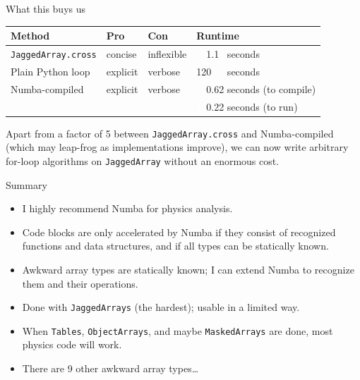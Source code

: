 \documentclass[aspectratio=169]{beamer}
\begin{document}
\begin{frame}{What this buys us}
\large
\vspace{0.5 cm}
\begin{center}
\begin{tabular}{l l l l}
{\bf Method} & {\bf Pro}  & {\bf Con}  & {\bf Runtime} \\\hline
{\tt\normalsize JaggedArray.cross} & concise  & inflexible & \textcolor{white}{12}1.1\textcolor{white}{2} seconds \\
Plain Python loop       & explicit & verbose    & 120\textcolor{white}{.62} seconds \\
Numba-compiled          & explicit & verbose    & \textcolor{white}{12}0.62 seconds (to compile) \\
                        &          &            & \textcolor{white}{12}0.22 seconds (to run)
\end{tabular}
\end{center}

\vspace{0.25 cm}
Apart from a factor of 5 between {\tt\normalsize JaggedArray.cross} and Numba-compiled (which may leap-frog as implementations improve), we can now write arbitrary for-loop algorithms on {\tt\normalsize JaggedArray} without an enormous cost.

\vspace{0.25 cm}
\end{frame}

\begin{frame}{Summary}
\large
\vspace{0.5 cm}
\begin{itemize}\setlength{\itemsep}{0.25 cm}
\item I highly recommend Numba for physics analysis.
\item Code blocks are only accelerated by Numba if they consist of recognized functions and data structures, and if all types can be statically known.
\item Awkward array types are statically known; I can extend Numba to recognize them and their operations.
\item Done with {\tt\normalsize JaggedArrays} (the hardest); usable in a limited way.
\item When {\tt\normalsize Tables}, {\tt\normalsize ObjectArrays}, and maybe {\tt\normalsize MaskedArrays} are done, most physics code will work.
\item There are 9 other awkward array types\ldots
\end{itemize}
\end{frame}
\end{document}
